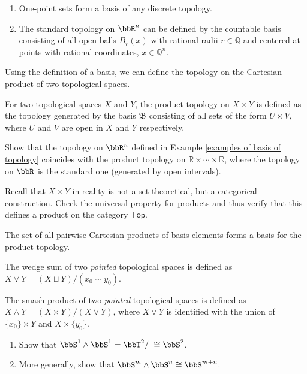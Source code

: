 \begin{example}\label{examples of basis of topology}
\begin{enumerate}
    \item One-point sets form a basis of any discrete topology.
    \item The standard topology on $\bbR^n$ can be defined by the countable basis consisting of all open balls $B_{r}(x)$ with rational radii $r\in\mathbb{Q}$ and centered at points with rational coordinates, $x\in\mathbb{Q}^n$.
\end{enumerate}
\end{example}

Using the definition of a basis, we can define the topology on the Cartesian product of two topological spaces.

\begin{defn}
For two topological spaces $X$ and $Y$, the product topology on $X\times Y$ is defined as the topology generated by the basis $\mathfrak{B}$ consisting of all sets of the form $U\times V$, where $U$ and $V$ are open in $X$ and $Y$ respectively.
\end{defn}

\begin{xca}
Show that the topology on $\bbR^n$ defined in Example \ref{examples of basis of topology} coincides with the product topology on $\mathbb R\times \cdots \times \mathbb R$, where the topology on $\bbR $ is the standard one (generated by open intervals).
\end{xca}
\begin{xca}
Recall that $X\times Y$ in reality is not a set theoretical, but a categorical construction. Check the universal property for products and thus verify that this defines a product on the category $\mathsf{Top}$.
\end{xca}

\begin{rem}
The set of all pairwise Cartesian products of basis elements forms a basis for the product topology.
\end{rem}

\begin{defn}
    The wedge sum of two \emph{pointed} topological spaces is defined as $X\vee Y=(X\sqcup Y)/(x_0\sim y_0)$.
\end{defn}
\begin{defn}
    The smash product of two \emph{pointed} topological spaces is defined as $X\wedge Y=(X\times Y)/(X\vee Y)$, where $X\vee Y$ is identified with the union of $\{x_0\}\times Y$ and $X\times \{y_0\}$.
\end{defn}
\begin{xca}\label{wedge sums}
    \begin{enumerate}
        \item Show that $\bbS^1\wedge \bbS^1=\bbT^2/~\cong \bbS^2$.
        \item More generally, show that $\bbS^m\wedge \bbS^n\cong \bbS^{m+n}$.
    \end{enumerate}
\end{xca}


